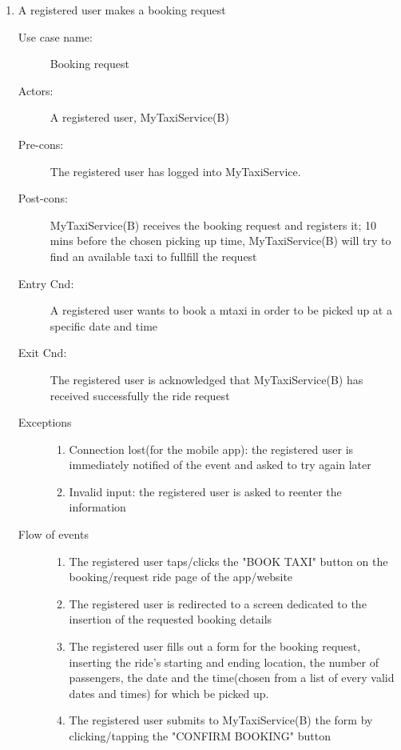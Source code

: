 \documentclass[11pt,titlepage]{article} %
\begin{document}
\begin{enumerate}
	      \item A registered user makes a booking request
		\begin{description}
		         \item [Use case name:] Booking request
		         \item [Actors:] A registered user, MyTaxiService(B)
		         \item [Pre-cons:] The registered user has logged into MyTaxiService.
		         \item [Post-cons:] MyTaxiService(B) receives the booking request and registers it; 10 mins before
		         the chosen picking up time, MyTaxiService(B) will try to find an available taxi to fullfill the request
		         \item [Entry Cnd:] A registered user wants to book a mtaxi in order to be picked up at a specific date and time
		         \item [Exit Cnd:] The registered user is acknowledged that MyTaxiService(B) has received successfully the ride
		         request
		         \item [Exceptions]\hfill
			\begin{enumerate}
			           \item Connection lost(for the mobile app): the registered user is immediately notified of the event and
			           asked to try again later
				\item Invalid input: the registered user is asked to reenter the information
			\end{enumerate}
		         \item [Flow of events]\hfill
			\begin{enumerate}
			           \item The registered user taps/clicks the "BOOK TAXI" button on the booking/request ride page of the app/website
			           \item The registered user is redirected to a screen dedicated to the insertion
			           of the requested booking details
			           \item The registered user fills out a form for the booking request, inserting the ride's starting and ending location,
			           the number of passengers, the date and the time(chosen from a list of every valid dates and times) for which be picked up.
			           \item The registered user submits to MyTaxiService(B) the form by clicking/tapping the "CONFIRM BOOKING" button
			\end{enumerate}

\end{description}
\end{enumerate}
\end{document}
